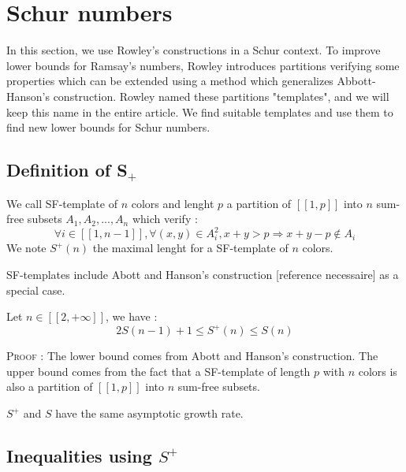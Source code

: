 \section{Schur numbers}

\qquad In this section, we use Rowley's constructions \cite{RowleyRamsey} in a Schur context. To improve lower bounds for Ramsay's
numbers, Rowley
introduces partitions verifying some properties which can be extended using a method which generalizes Abbott-Hanson's
\cite{AbbottHanson} construction.
Rowley named these partitions "templates", and we will keep this name in the entire article. We find suitable templates
and use them
 to find new lower bounds for Schur numbers.

\subsection{Definition of S\(_+\)}

\begin{definition}
We call SF-template of \(n\) colors and lenght \(p\) a partition of \( [\![1,p]\!]\) into \(n\) sum-free subsets \(A_1,
A_2, ..., A_n\) which verify :
	\[
	\forall i \in [\![1, n-1]\!], \forall (x,y) \in A_i^2, x+y > p
	\Longrightarrow x+y-p \notin A_i
	\]
	We note \(S^+(n)\) the maximal lenght for a SF-template of \(n\) colors.
\end{definition}

\begin{remark}
	SF-templates include Abott and Hanson's construction [reference necessaire] as a special case.
\end{remark}

\begin{proposition}
	Let \(n \in [\![2, +\infty]\!]\), we have :
	\[
	2S(n-1)+1 \leqslant S^+(n) \leqslant S(n)
	\]
\end{proposition}

\textsc{Proof :} The lower bound comes from Abott and Hanson's construction. The upper bound comes
from the fact that a SF-template of length \(p\) with \(n\) colors is also a partition of
\([\![1, p]\!]\) into \(n\) sum-free subsets.

\begin{remark}
	\(S^+\) and \(S\) have the same asymptotic growth rate.
\end{remark}


\subsection{Inequalities using \(S^+\)}

